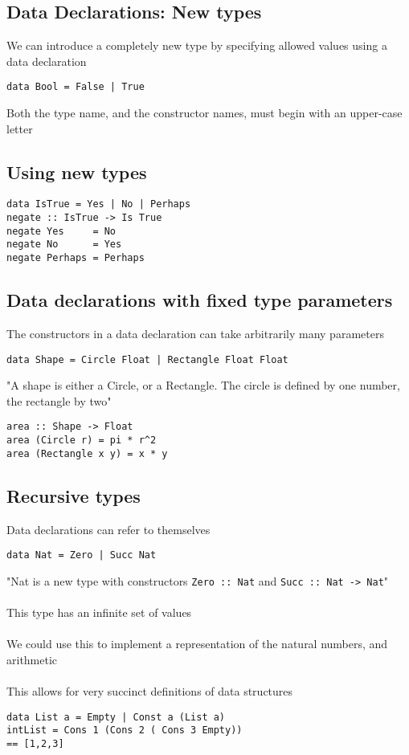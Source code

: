 \documentclass{article}[18pt]
\begin{document}
\subsection{Data Declarations: New types}
We can introduce a completely new type by specifying allowed values using a data declaration
\begin{verbatim}
data Bool = False | True
\end{verbatim}
Both the type name, and the constructor names, must begin with an upper-case letter
\subsection{Using new types}
\begin{verbatim}
data IsTrue = Yes | No | Perhaps
negate :: IsTrue -> Is True
negate Yes     = No
negate No      = Yes
negate Perhaps = Perhaps
\end{verbatim}
\subsection{Data declarations with fixed type parameters}
The constructors in a data declaration can take arbitrarily many parameters
\begin{verbatim}
data Shape = Circle Float | Rectangle Float Float
\end{verbatim}
"A shape is either a Circle, or a Rectangle. The circle is defined by one number, the rectangle by two"
\begin{verbatim}
area :: Shape -> Float
area (Circle r) = pi * r^2
area (Rectangle x y) = x * y
\end{verbatim}
\subsection{Recursive types}
Data declarations can refer to themselves
\begin{verbatim}
data Nat = Zero | Succ Nat
\end{verbatim}
"Nat is a new type with constructors \texttt{Zero :: Nat} and \texttt{Succ :: Nat -> Nat}"\\
\\
This type has an infinite set of values\\
\\
We could use this to implement a representation of the natural numbers, and arithmetic\\
\\
This allows for very succinct definitions of data structures
\begin{verbatim}
data List a = Empty | Const a (List a)
intList = Cons 1 (Cons 2 ( Cons 3 Empty))
== [1,2,3]
\end{verbatim}
\end{document}
